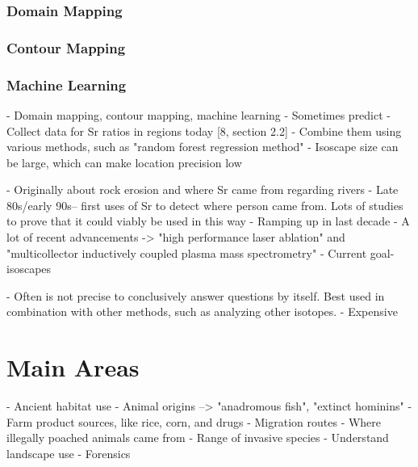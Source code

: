 \documentclass[a4paper, 12pt]{article}
\begin{document}
\subsubsection{Domain Mapping}
\subsubsection{Contour Mapping}
\subsubsection{Machine Learning}



- Domain mapping, contour mapping, machine learning \citep{bataille2020}
- Sometimes predict \citep{bataille2020}
- Collect data for Sr ratios in regions today \citep{bataille2020} [8, section 2.2]
- Combine them using various methods, such as "random forest regression method" \citep{bataille2020}
- Isoscape size can be large, which can make location precision low \citep{holt2021}


- Originally about rock erosion and where Sr came from regarding rivers \citep{crowley2017}
- Late 80s/early 90s-- first uses of Sr to detect where person came from. Lots of studies to prove that it could viably be used in this way\citep{crowley2017}
- Ramping up in last decade \citep{crowley2017}
- A lot of recent advancements  \citep{holt2021}
-> "high performance laser ablation" and "multicollector inductively coupled plasma mass spectrometry"
- Current goal- isoscapes \citep{holt2021}


- Often is not precise to conclusively answer questions by itself. Best used in combination with other methods, such as analyzing other isotopes. \citep{holt2021}
- Expensive \citep{crowley2017}



\section{Main Areas}
- Ancient habitat use \citep{crowley2017}
- Animal origins \citep{crowley2017}
--> "anadromous fish", "extinct hominins"
- Farm product sources, like rice, corn, and drugs \citep{crowley2017}
- Migration routes \citep{crowley2017}
- Where illegally poached animals came from \citep{crowley2017}
- Range of invasive species \citep{crowley2017}
- Understand landscape use \citep{crowley2017}
- Forensics \citep{kamenov2014}
\end{document}
